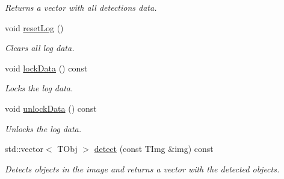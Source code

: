 \begin{DoxyCompactItemize}
\begin{DoxyCompactList}\small\item\em Returns a vector with all detections data. \end{DoxyCompactList}\item 
\hypertarget{class_vision_core_1_1_abstractions_1_1_detector_logger_a0f269bca8139be827d8f673bed676f60}{}void \hyperlink{class_vision_core_1_1_abstractions_1_1_detector_logger_a0f269bca8139be827d8f673bed676f60}{reset\+Log} ()\label{class_vision_core_1_1_abstractions_1_1_detector_logger_a0f269bca8139be827d8f673bed676f60}

\begin{DoxyCompactList}\small\item\em Clears all log data. \end{DoxyCompactList}\item 
void \hyperlink{class_vision_core_1_1_abstractions_1_1_detector_logger_a50968bdeed09c7b26cb46c839fe55a52}{lock\+Data} () const 
\begin{DoxyCompactList}\small\item\em Locks the log data. \end{DoxyCompactList}\item 
\hypertarget{class_vision_core_1_1_abstractions_1_1_detector_logger_a59ce319514ddd7916f8962e25cc85869}{}void \hyperlink{class_vision_core_1_1_abstractions_1_1_detector_logger_a59ce319514ddd7916f8962e25cc85869}{unlock\+Data} () const \label{class_vision_core_1_1_abstractions_1_1_detector_logger_a59ce319514ddd7916f8962e25cc85869}

\begin{DoxyCompactList}\small\item\em Unlocks the log data. \end{DoxyCompactList}\item 
std\+::vector$<$ T\+Obj $>$ \hyperlink{class_vision_core_1_1_abstractions_1_1_detector_logger_a1f2edd31854cbaeed7db844d4e5bcbfc}{detect} (const T\+Img \&img) const 
\begin{DoxyCompactList}\small\item\em Detects objects in the image and returns a vector with the detected objects. \end{DoxyCompactList}\end{DoxyCompactItemize}
